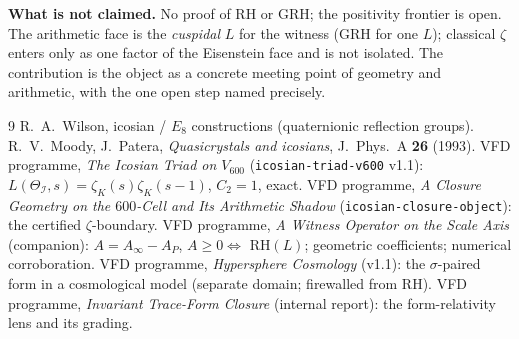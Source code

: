 \documentclass[11pt]{article}
\theoremstyle{definition}
\newcommand{\zetaK}{\zeta_{K}}
\newcommand{\Icos}{\mathcal{I}}
\begin{document}
\textbf{What is not claimed.} No proof of RH or GRH; the positivity frontier is open. The
arithmetic face is the \emph{cuspidal} $L$ for the witness (GRH for one $L$); classical
$\zeta$ enters only as one factor of the Eisenstein face and is not isolated. The
contribution is the object as a concrete meeting point of geometry and arithmetic, with the
one open step named precisely.

\begin{thebibliography}{9}
 R.~A.~Wilson, icosian / $E_8$ constructions (quaternionic reflection groups).
 R.~V.~Moody, J.~Patera, \emph{Quasicrystals and icosians},
  J.~Phys.~A \textbf{26} (1993).
 VFD programme, \emph{The Icosian Triad on $V_{600}$}
  (\texttt{icosian-triad-v600} v1.1): $L(\Theta_\Icos,s)=\zetaK(s)\zetaK(s-1)$, $C_2=1$, exact.
 VFD programme, \emph{A Closure Geometry on the $600$-Cell and Its Arithmetic
  Shadow} (\texttt{icosian-closure-object}): the certified $\zeta$-boundary.
 VFD programme, \emph{A Witness Operator on the Scale Axis} (companion):
  $A=A_\infty-A_P$, $A\ge0\iff$ RH$(L)$; geometric coefficients; numerical corroboration.
 VFD programme, \emph{Hypersphere Cosmology} (v1.1): the $\sigma$-paired form
  in a cosmological model (separate domain; firewalled from RH).
 VFD programme, \emph{Invariant Trace-Form Closure} (internal report): the
  form-relativity lens and its grading.
\end{thebibliography}
\end{document}
